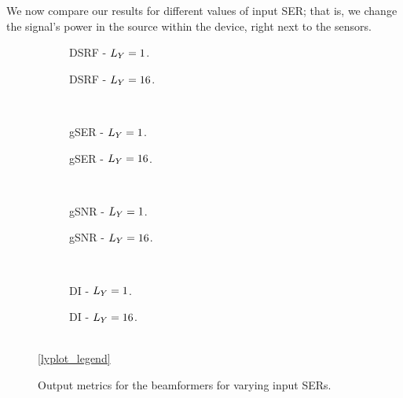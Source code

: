 We now compare our results for different values of input SER; that is, we change the signal's power in the source within the device, right next to the sensors.
\begin{figure}[!ht]
	\centering
	\begin{subfigure}{0.49\textwidth}
		\centering
		
		\caption{DSRF - $\Ly = 1$.}
		\label{subfig:lineplot__DSRF__iSER_var__Ly_1}
	\end{subfigure}\hfill
	\begin{subfigure}{0.49\textwidth}
		\centering
		
		\caption{DSRF - $\Ly = 16$.}
		\label{subfig:lineplot__DSRF__iSER_var__Ly_16}
	\end{subfigure}\\[1em]
	\begin{subfigure}{0.49\textwidth}
		\centering
		
		\caption{gSER - $\Ly = 1$.}
		\label{subfig:lineplot__gSER__iSER_var__Ly_1}
	\end{subfigure}\hfill
	\begin{subfigure}{0.49\textwidth}
		\centering
		
		\caption{gSER - $\Ly = 16$.}
		\label{subfig:lineplot__gSER__iSER_var__Ly_16}
	\end{subfigure}\\[1em]
	\begin{subfigure}{0.49\textwidth}
		\centering
		
		\caption{gSNR - $\Ly = 1$.}
		\label{subfig:lineplot__gSNR__iSER_var__Ly_1}
	\end{subfigure}\hfill
	\begin{subfigure}{0.49\textwidth}
		\centering
		
		\caption{gSNR - $\Ly = 16$.}
		\label{subfig:lineplot__gSNR__iSER_var__Ly_16}
	\end{subfigure}\\[1em]
	\begin{subfigure}{0.49\textwidth}
		\centering
		
		\caption{DI - $\Ly = 1$.}
		\label{subfig:lineplot__DI__iSER_var__Ly_1}
	\end{subfigure}\hfill
	\begin{subfigure}{0.49\textwidth}
		\centering
		
		\caption{DI - $\Ly = 16$.}
		\label{subfig:lineplot__DI__iSER_var__Ly_16}
	\end{subfigure}\\[1em]
	\ref*{lyplot_legend}
	\caption{Output metrics for the beamformers for varying input SERs.}
	\label{fig:lineplot__iSER_var__Ly_1}
\end{figure}

